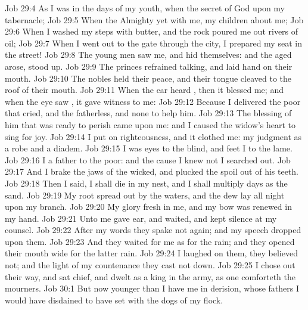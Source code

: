 \vs Job 29:4 As I was in the days of my youth, when the secret of God  upon my tabernacle;
\vs Job 29:5 When the Almighty  yet with me,  my children  about me;
\vs Job 29:6 When I washed my steps with butter, and the rock poured me out rivers of oil;
\vs Job 29:7 When I went out to the gate through the city,  I prepared my seat in the street!
\vs Job 29:8 The young men saw me, and hid themselves: and the aged arose,  stood up.
\vs Job 29:9 The princes refrained talking, and laid  hand on their mouth.
\vs Job 29:10 The nobles held their peace, and their tongue cleaved to the roof of their mouth.
\vs Job 29:11 When the ear heard , then it blessed me; and when the eye saw , it gave witness to me:
\vs Job 29:12 Because I delivered the poor that cried, and the fatherless, and  none to help him.
\vs Job 29:13 The blessing of him that was ready to perish came upon me: and I caused the widow's heart to sing for joy.
\vs Job 29:14 I put on righteousness, and it clothed me: my judgment  as a robe and a diadem.
\vs Job 29:15 I was eyes to the blind, and feet  I to the lame.
\vs Job 29:16 I  a father to the poor: and the cause  I knew not I searched out.
\vs Job 29:17 And I brake the jaws of the wicked, and plucked the spoil out of his teeth.
\vs Job 29:18 Then I said, I shall die in my nest, and I shall multiply  days as the sand.
\vs Job 29:19 My root  spread out by the waters, and the dew lay all night upon my branch.
\vs Job 29:20 My glory  fresh in me, and my bow was renewed in my hand.
\vs Job 29:21 Unto me  gave ear, and waited, and kept silence at my counsel.
\vs Job 29:22 After my words they spake not again; and my speech dropped upon them.
\vs Job 29:23 And they waited for me as for the rain; and they opened their mouth wide  for the latter rain.
\vs Job 29:24  I laughed on them, they believed  not; and the light of my countenance they cast not down.
\vs Job 29:25 I chose out their way, and sat chief, and dwelt as a king in the army, as one  comforteth the mourners.
\vs Job 30:1 But now  younger than I have me in derision, whose fathers I would have disdained to have set with the dogs of my flock.
